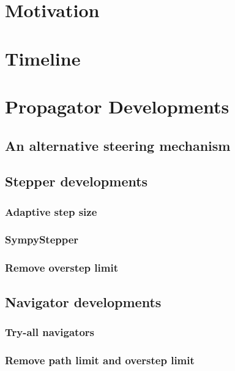 \section{Motivation}


\section{Timeline}

\section{Propagator Developments}

\subsection{An alternative steering mechanism}

\subsection{Stepper developments}

\subsubsection{Adaptive step size}

\subsubsection{SympyStepper}

\subsubsection{Remove overstep limit}

\subsection{Navigator developments}

\subsubsection{Try-all navigators}

\subsubsection{Remove path limit and overstep limit}

